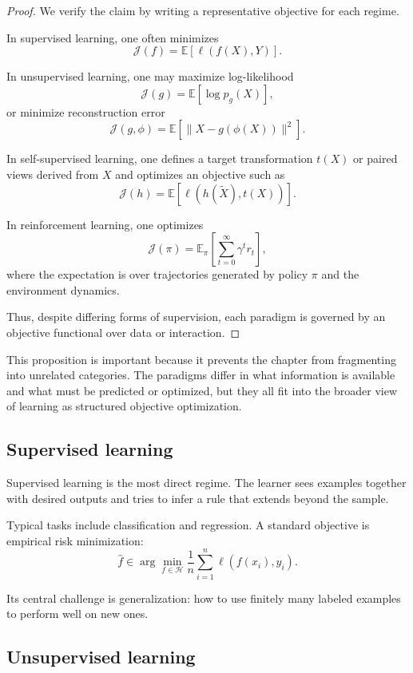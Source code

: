 \begin{proof}
We verify the claim by writing a representative objective for each regime.

In supervised learning, one often minimizes
\[
\mathcal J(f)=\mathbb E[\ell(f(X),Y)].
\]

In unsupervised learning, one may maximize log-likelihood
\[
\mathcal J(g)=\mathbb E[\log p_g(X)],
\]
or minimize reconstruction error
\[
\mathcal J(g,\phi)=\mathbb E[\|X-g(\phi(X))\|^2].
\]

In self-supervised learning, one defines a target transformation $t(X)$ or paired views derived from $X$ and optimizes an objective such as
\[
\mathcal J(h)=\mathbb E[\ell(h(\tilde X), t(X))].
\]

In reinforcement learning, one optimizes
\[
\mathcal J(\pi)=\mathbb E_\pi\!\left[\sum_{t=0}^\infty \gamma^t r_t\right],
\]
where the expectation is over trajectories generated by policy $\pi$ and the environment dynamics.

Thus, despite differing forms of supervision, each paradigm is governed by an objective functional over data or interaction.
\end{proof}

This proposition is important because it prevents the chapter from fragmenting into unrelated categories. The paradigms differ in what information is available and what must be predicted or optimized, but they all fit into the broader view of learning as structured objective optimization.

\subsection*{Supervised learning}

Supervised learning is the most direct regime. The learner sees examples together with desired outputs and tries to infer a rule that extends beyond the sample.

Typical tasks include classification and regression. A standard objective is empirical risk minimization:
\[
\hat f \in \arg\min_{f\in\mathcal H} \frac1n\sum_{i=1}^n \ell(f(x_i),y_i).
\]

Its central challenge is generalization: how to use finitely many labeled examples to perform well on new ones.

\subsection*{Unsupervised learning}

